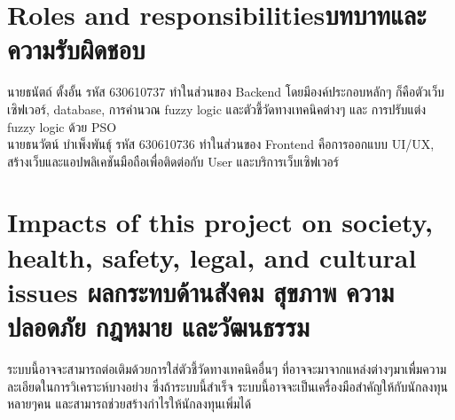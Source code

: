 \section{\ifenglish Roles and responsibilities\else บทบาทและความรับผิดชอบ\fi}
นายธนัตถ์ ตั้งอั้น รหัส 630610737 ทำในส่วนของ Backend โดยมีองค์ประกอบหลักๆ ก็คือตัวเว็บเซิฟเวอร์, database, การคำนวณ fuzzy logic และตัวชี้วัดทางเทคนิคต่างๆ และ
การปรับแต่ง fuzzy logic ด้วย PSO\\
นายธนวัตน์ บำเพ็งพันธุ์ รหัส 630610736 ทำในส่วนของ Frontend คือการออกแบบ UI/UX, สร้างเว็บและแอปพลิเคชันมือถือเพื่อติดต่อกับ User และบริการเว็บเซิฟเวอร์

\section{\ifenglish%
Impacts of this project on society, health, safety, legal, and cultural issues
\else%
ผลกระทบด้านสังคม สุขภาพ ความปลอดภัย กฎหมาย และวัฒนธรรม
\fi}
ระบบนี้อาจจะสามารถต่อเติมด้วยการใส่ตัวชี้วัดทางเทคนิคอื่นๆ ที่อาจจะมาจากแหล่งต่างๆมาเพื่มความละเอียดในการวิเคราะห์บางอย่าง
ซึ่งถ้าระบบนี้สำเร็จ ระบบนี้อาจจะเป็นเครื่องมือสำคัญให้กับนักลงทุนหลายๆคน และสามารถช่วยสร้างกำไรให้นักลงทุนเพิ่มได้ 
